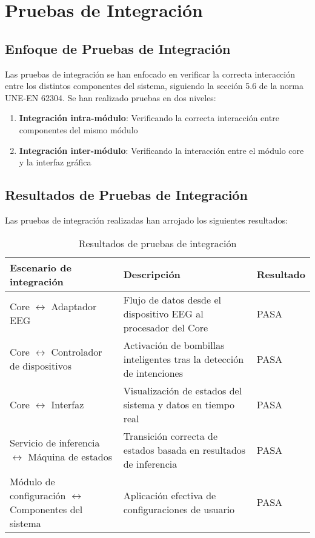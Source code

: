 \section{Pruebas de Integración}

\subsection{Enfoque de Pruebas de Integración}

Las pruebas de integración se han enfocado en verificar la correcta interacción entre los distintos componentes del sistema, siguiendo la sección 5.6 de la norma UNE-EN 62304. Se han realizado pruebas en dos niveles:

\begin{enumerate}
    \item \textbf{Integración intra-módulo}: Verificando la correcta interacción entre componentes del mismo módulo
    \item \textbf{Integración inter-módulo}: Verificando la interacción entre el módulo core y la interfaz gráfica
\end{enumerate}

\subsection{Resultados de Pruebas de Integración}

Las pruebas de integración realizadas han arrojado los siguientes resultados:

\begin{table}[ht]
    \centering
    \begin{tabular}{|p{4cm}|p{7cm}|p{2cm}|}
        \hline
        \textbf{Escenario de integración} & \textbf{Descripción} & \textbf{Resultado} \\
        \hline
        Core $\leftrightarrow$ Adaptador EEG & Flujo de datos desde el dispositivo EEG al procesador del Core & PASA \\
        \hline
        Core $\leftrightarrow$ Controlador de dispositivos & Activación de bombillas inteligentes tras la detección de intenciones & PASA \\
        \hline
        Core $\leftrightarrow$ Interfaz & Visualización de estados del sistema y datos en tiempo real & PASA \\
        \hline
        Servicio de inferencia $\leftrightarrow$ Máquina de estados & Transición correcta de estados basada en resultados de inferencia & PASA \\
        \hline
        Módulo de configuración $\leftrightarrow$ Componentes del sistema & Aplicación efectiva de configuraciones de usuario & PASA \\
        \hline
    \end{tabular}
    \caption{Resultados de pruebas de integración}
    \label{tab:integration_tests}
\end{table}


